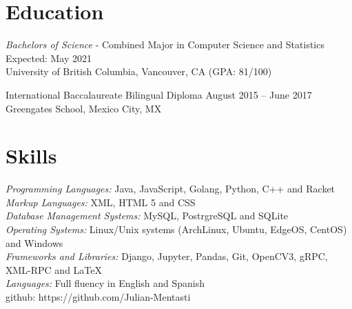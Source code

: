 \documentclass[letter]{res}
\begin{document}
\address{ (778)-882-3453 \\}
\address{
  \texttt{julian@mentasti.net}\\ } 
\begin{resume}
  \noindent\makebox[\linewidth]{\rule{\paperwidth}{0.4pt}}

\section{Education}
{\sl Bachelors of Science} - Combined Major in Computer Science and Statistics \hfill Expected: May 2021\\
University of British Columbia,  Vancouver, CA \hfill (GPA: 81/100)
  \vspace{-4mm}
  
International Baccalaureate Bilingual Diploma \hfill August 2015 – June 2017\\
Greengates School, Mexico City, MX
 \vspace{-2mm}

\section{Skills}
{\sl Programming Languages:}  Java, JavaScript, Golang, Python, C++ and Racket\\
{\sl Markup Languages:} XML, HTML 5 and CSS \\
{\sl Database Management Systems:} MySQL, PostrgreSQL and SQLite \\
{\sl Operating Systems:} Linux/Unix systems (ArchLinux, Ubuntu, EdgeOS, CentOS) and Windows \\ 
{\sl Frameworks and Libraries:} Django, Jupyter, Pandas, Git, OpenCV3, gRPC, XML-RPC and  \LaTeX \\ 
{\sl Languages:} Full fluency in English and Spanish \\
github: https://github.com/Julian-Mentasti
 \vspace{-4mm}


\end{resume}
\end{document}
